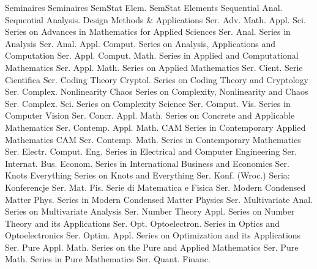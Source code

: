 {Seminaires}
{Seminaires}
{SemStat Elem.}
{SemStat Elements}
{Sequential Anal.}
{Sequential Analysis. Design Methods & Applications}
{Ser. Adv. Math. Appl. Sci.}
{Series on Advances in Mathematics for Applied Sciences}
{Ser. Anal.}
{Series in Analysis}
{Ser. Anal. Appl. Comput.}
{Series on Analysis, Applications and Computation}
{Ser. Appl. Comput. Math.}
{Series in Applied and Computational Mathematics}
{Ser. Appl. Math.}
{Series on Applied Mathematics}
{Ser. Cient.}
{Serie Cientifica}
{Ser. Coding Theory Cryptol.}
{Series on Coding Theory and Cryptology}
{Ser. Complex. Nonlinearity Chaos}
{Series on Complexity, Nonlinearity and Chaos}
{Ser. Complex. Sci.}
{Series on Complexity Science}
{Ser. Comput. Vis.}
{Series in Computer Vision}
{Ser. Concr. Appl. Math.}
{Series on Concrete and Applicable Mathematics}
{Ser. Contemp. Appl. Math. CAM}
{Series in Contemporary Applied Mathematics CAM}
{Ser. Contemp. Math.}
{Series in Contemporary Mathematics}
{Ser. Electr. Comput. Eng.}
{Series in Electrical and Computer Engineering}
{Ser. Internat. Bus. Econom.}
{Series in International Business and Economics}
{Ser. Knots Everything}
{Series on Knots and Everything}
{Ser. Konf. (Wroc.)}
{Seria: Konferencje}
{Ser. Mat. Fis.}
{Serie di Matematica e Fisica}
{Ser. Modern Condensed Matter Phys.}
{Series in Modern Condensed Matter Physics}
{Ser. Multivariate Anal.}
{Series on Multivariate Analysis}
{Ser. Number Theory Appl.}
{Series on Number Theory and its Applications}
{Ser. Opt. Optoelectron.}
{Series in Optics and Optoelectronics}
{Ser. Optim. Appl.}
{Series on Optimization and its Applications}
{Ser. Pure Appl. Math.}
{Series on the Pure and Applied Mathematics}
{Ser. Pure Math.}
{Series in Pure Mathematics}
{Ser. Quant. Financ.}
